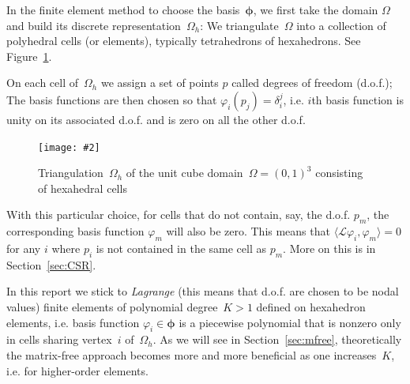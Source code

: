 \documentclass[12pt]{article}
\newcommand{\includegraphicsw}[2][1.]{\texttt{[image: \#2]}}
\newcommand{\vect}[1]{\boldsymbol{\mathbf{#1}}}
\newcommand{\AZ}[1]{{\color{red}\textbf{AZ}:~#1}}
\begin{document}
In the finite element method to choose the basis~$\vect\phi$, we first take the domain $\Omega$ and build its discrete representation~$\Omega_h$: We triangulate~$\Omega$ into a collection of polyhedral cells (or elements), typically tetrahedrons of hexahedrons. See Figure~\ref{fig:mesh}.

%

On each cell of~$\Omega_h$ we assign a set of points $p$ called degrees of freedom (d.o.f.); The basis functions are then chosen so that $\varphi_{i}(p_{j}) = \delta_{i}^{j}$, i.e. $i$th basis function is unity on its associated d.o.f. and is zero on all the other d.o.f. %

\begin{figure}[H]
	\centering
	\includegraphicsw[.4]{mesh.png}
	\caption{Triangulation~$\Omega_h$ of the unit cube domain~$\Omega = (0, 1)^{3}$ consisting of hexahedral cells}\label{fig:mesh}
\end{figure}

With this particular choice, for cells that do not contain, say, the d.o.f. $p_{m}$, the corresponding basis function $\varphi_{m}$ will also be zero. This means that $\langle \mathcal{L}\varphi_{i}, \varphi_{m}\rangle = 0$ for any $i$ where $p_{i}$ is not contained in the same cell as $p_{m}$. More on this is in Section~\ref{sec:CSR}.

In this report we stick to \textit{Lagrange} (this means that d.o.f. are chosen to be nodal values) finite elements of polynomial degree~$K > 1$ defined on hexahedron elements, i.e. basis function $\varphi_i \in \vect\phi$ is a piecewise polynomial that is nonzero only in cells sharing vertex~$i$ of~$\Omega_h$. As we will see in Section~\ref{sec:mfree}, theoretically the matrix-free approach becomes more and more beneficial as one increases~$K$, i.e. for higher-order elements. 
\end{document}
